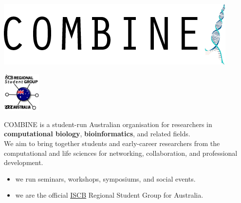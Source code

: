 \documentclass[svgnames]{beamer}
\newcommand{\beamerpurple}[1]{{\usebeamercolor[fg]{title}#1}}
\begin{document}
\begin{frame}
    \vfill
    \begin{minipage}[c]{\linewidth}
        \centering
        \hfill
        \begin{minipage}[c]{0.45\linewidth}
            \centering
            \includegraphics[width=\linewidth]{./images/COMBINE-logo.png}
        \end{minipage}
        \begin{minipage}[c]{0.45\linewidth}
            \centering
            \includegraphics[height=20mm]{./images/RSGAU-logo.png}
        \end{minipage}
        \hfill
    \end{minipage}
    \vfill
    \beamerpurple{COMBINE} is a student-run Australian organisation for researchers in
    \textbf{computational biology}, \textbf{bioinformatics}, and related
    fields.\\[2ex]
    We aim to bring together students and early-career
    researchers from the computational and life sciences for networking,
    collaboration, and professional development.\\[1ex]
    \begin{itemize}
        \item we run seminars, workshops, symposiums, and social events.
        \item we are the official
        \href{http://www.iscb.org/}{\beamerpurple{ISCB}} Regional Student Group for
        Australia.
    \end{itemize}
    \vfill
\end{frame}
\end{document}
